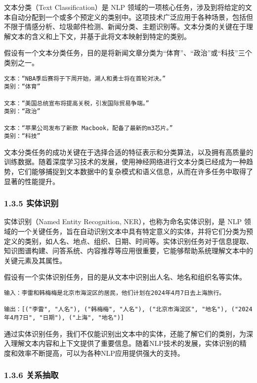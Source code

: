 \documentclass[12pt,a4paper]{book}
\begin{document}
文本分类（Text Classification）是 NLP
领域的一项核心任务，涉及到将给定的文本自动分配到一个或多个预定义的类别中。这项技术广泛应用于各种场景，包括但不限于情感分析、垃圾邮件检测、新闻分类、主题识别等。文本分类的关键在于理解文本的含义和上下文，并基于此将文本映射到特定的类别。

假设有一个文本分类任务，目的是将新闻文章分类为``体育''、``政治''或``科技''三个类别之一。

\begin{verbatim}
文本：“NBA季后赛将于下周开始，湖人和勇士将在首轮对决。”
类别：“体育”

文本：“美国总统宣布将提高关税，引发国际贸易争端。”
类别：“政治”

文本：“苹果公司发布了新款 Macbook，配备了最新的m3芯片。”
类别：“科技”
\end{verbatim}

文本分类任务的成功关键在于选择合适的特征表示和分类算法，以及拥有高质量的训练数据。随着深度学习技术的发展，使用神经网络进行文本分类已经成为一种趋势，它们能够捕捉到文本数据中的复杂模式和语义信息，从而在许多任务中取得了显著的性能提升。

\subsubsection{1.3.5 实体识别}\label{ux5b9eux4f53ux8bc6ux522b}

实体识别（Named Entity Recognition, NER），也称为命名实体识别，是 NLP
领域的一个关键任务，旨在自动识别文本中具有特定意义的实体，并将它们分类为预定义的类别，如人名、地点、组织、日期、时间等。实体识别任务对于信息提取、知识图谱构建、问答系统、内容推荐等应用很重要，它能够帮助系统理解文本中的关键元素及其属性。

假设有一个实体识别任务，目的是从文本中识别出人名、地名和组织名等实体。

\begin{verbatim}
输入：李雷和韩梅梅是北京市海淀区的居民，他们计划在2024年4月7日去上海旅行。

输出：[("李雷", "人名"), ("韩梅梅", "人名"), ("北京市海淀区", "地名"), ("2024年4月7日", "日期"), ("上海", "地名")]
\end{verbatim}

通过实体识别任务，我们不仅能识别出文本中的实体，还能了解它们的类别，为深入理解文本内容和上下文提供了重要信息。随着NLP技术的发展，实体识别的精度和效率不断提高，可以为各种NLP应用提供强大的支持。

\subsubsection{1.3.6 关系抽取}\label{ux5173ux7cfbux62bdux53d6}
\end{document}
